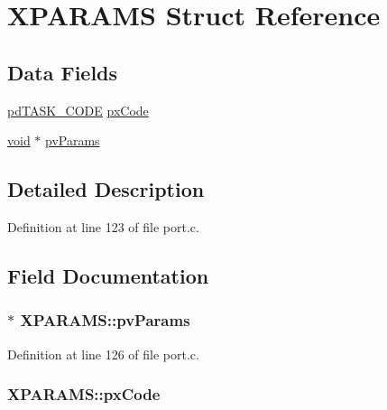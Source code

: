 \hypertarget{struct_x_p_a_r_a_m_s}{\section{X\-P\-A\-R\-A\-M\-S Struct Reference}
\label{struct_x_p_a_r_a_m_s}
}
\subsection*{Data Fields}
\begin{DoxyCompactItemize}
\item 
\hyperlink{win32_2win32_2_libraries_2_free_r_t_o_s_2_source_2include_2projdefs_8h_ae74d12a2f9cb1fcae89532830b5413ac}{pd\-T\-A\-S\-K\-\_\-\-C\-O\-D\-E} \hyperlink{struct_x_p_a_r_a_m_s_a2ad67da126016f1c10ec077ca41b74be}{px\-Code}
\item 
\hyperlink{group___n_a_m_e_ga18028b8badbf1ea7e704ccac3c488e82}{void} $\ast$ \hyperlink{struct_x_p_a_r_a_m_s_a97a762acac0b14403a5d7059605f90ef}{pv\-Params}
\end{DoxyCompactItemize}


\subsection{Detailed Description}


Definition at line 123 of file port.\-c.



\subsection{Field Documentation}
\hypertarget{struct_x_p_a_r_a_m_s_a97a762acac0b14403a5d7059605f90ef}{
\subsubsection[{pv\-Params}]{ $\ast$ X\-P\-A\-R\-A\-M\-S\-::pv\-Params}}\label{struct_x_p_a_r_a_m_s_a97a762acac0b14403a5d7059605f90ef}


Definition at line 126 of file port.\-c.

\hypertarget{struct_x_p_a_r_a_m_s_a2ad67da126016f1c10ec077ca41b74be}{
\subsubsection[{px\-Code}]{ X\-P\-A\-R\-A\-M\-S\-::px\-Code}}\label{struct_x_p_a_r_a_m_s_a2ad67da126016f1c10ec077ca41b74be}


